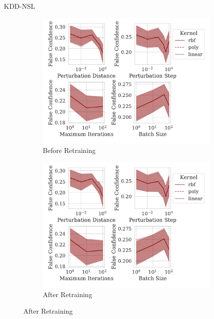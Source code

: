 \documentclass{beamer}
\begin{document}
\begin{frame}{KDD-NSL}
\begin{figure}
\begin{subfigure}{0.4\textwidth}
         \centering
         \includegraphics[width=\textwidth]{./kdd-nsl/confidence_vs_attack_parameters.pdf}
         \caption{Before Retraining}
     \end{subfigure}
     \hfill
     \begin{subfigure}{0.4\textwidth}
         \centering
         \includegraphics[width=\textwidth]{./kdd-nsl/retrain_confidence_vs_attack_parameters.pdf}
         \caption{After Retraining}
     \end{subfigure}
     
     \label{fig:kdd-nsl}
\end{figure}
\end{frame}
\end{document}
